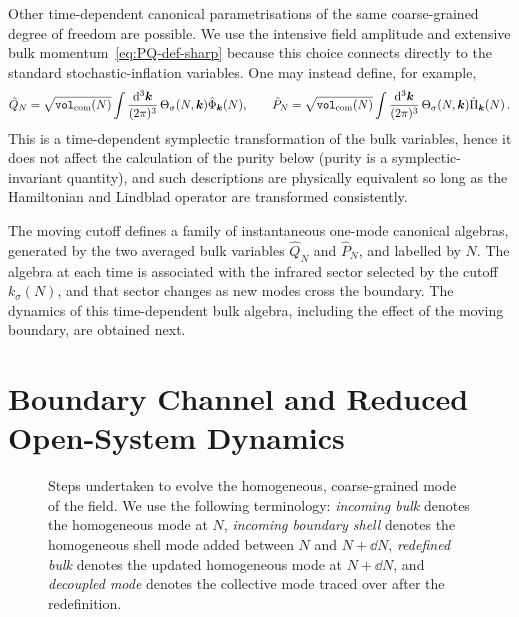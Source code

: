 \documentclass{article}
\newcommand{\VF}{\mathtt{vol}_{\rm com}}
\newcommand{\hvarphi}{\hat{\Phi}}
\newcommand{\hpi}{\hat{\Pi}}
\numberwithin{equation}{section}
\begin{document}
	Other time-dependent canonical parametrisations of the same coarse-grained degree of freedom are possible. We use the intensive field amplitude and extensive bulk momentum~\eqref{eq:PQ-def-sharp} because this choice connects directly to the standard stochastic-inflation variables. One may instead define, for example, 
\begin{equation}
\tilde Q_N = \sqrt{\VF(N)} \int \frac{\dd ^3\bm{k}}{(2\pi)^3} \, \Theta_\sigma(N,\bm k)\hvarphi_{\bm k}(N), \qquad \tilde P_N = \sqrt{\VF(N)} \int \frac{\dd^3\bm{k}}{(2\pi)^3} \, \Theta_\sigma(N,\bm k)\hpi_{\bm k}(N)\, . 
\end{equation}
This is a time-dependent symplectic transformation of the bulk variables, hence it does not affect the calculation of the purity below (purity is a symplectic-invariant quantity), and such descriptions are physically equivalent so long as the Hamiltonian and Lindblad operator are transformed consistently.

	The moving cutoff defines a family of instantaneous one-mode canonical algebras, generated by the two averaged bulk variables $\hat Q_N$ and $\hat P_N$, and labelled by \(N\). The algebra at each time is associated with the infrared sector selected by the cutoff \(k_\sigma(N)\), and that sector changes as new modes cross the boundary. The dynamics of this time-dependent bulk algebra, including the effect of the moving boundary, are obtained next.

	\section{Boundary Channel and Reduced Open-System Dynamics}
	\label{sec:boundary_fluctuations}

	\begin{figure}[ht]
		\begin{center}
			
			\caption{\small Steps undertaken to evolve the homogeneous, coarse-grained mode of the field. We use the following terminology: \textit{incoming bulk} denotes the homogeneous mode at \(N\), \textit{incoming boundary shell} denotes the homogeneous shell mode added between \(N\) and \(N+\dd N\), \textit{redefined bulk} denotes the updated homogeneous mode at \(N+\dd N\), and \textit{decoupled mode} denotes the collective mode traced over after the redefinition.
            }
		\label{fig:bulk_boundary}
		\end{center}
	\end{figure}
\end{document}
